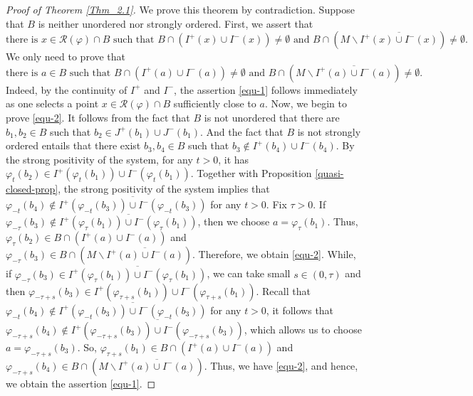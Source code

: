 \documentclass[a4paper,11pt]{article}
\theoremstyle{plain}
\theoremstyle{definition}
\numberwithin{equation}{section}
\begin{document}
	\begin{proof}[Proof of Theorem \ref{Thm_2.1}]
		We prove this theorem by contradiction. Suppose that $B$ is neither unordered nor strongly ordered. First, we assert that
		\begin{equation}\label{equ-1}
			 \text{there is } x\in \mathcal{R}(\varphi)\cap B \text{ such that } B\cap (I^+(x)\cup I^-(x))\neq\emptyset \text{ and } B\cap (M\backslash \overline{I^+(x)\cup I^-(x)})\neq\emptyset.
		\end{equation}
		We only need to prove that 
		\begin{equation}\label{equ-2}
		\text{there is } a\in B \text{ such that } B\cap (I^+(a)\cup I^-(a))\neq\emptyset \text{~and~} B\cap (M\backslash \overline{I^+(a)\cup I^-(a)})\neq\emptyset.
		\end{equation}
		Indeed, by the continuity of $I^{+}$ and $I^{-}$, the assertion \eqref{equ-1} follows immediately as one selects a point $x\in \mathcal{R}(\varphi)\cap B$ sufficiently close to $a$.
        Now, we begin to prove \eqref{equ-2}. It follows from the fact that $B$ is not unordered that there are $b_1,b_2 \in B$ such that $b_2\in J^{+}(b_1)\cup J^{-}(b_1)$. 
        And the fact that $B$ is not strongly ordered entails that there exist $b_3,b_4 \in B$ such that $b_3\notin I^+(b_4)\cup I^-(b_4)$. 
        By the strong positivity of the system, for any $t>0$, it has $\varphi_{t}(b_2)\in I^+(\varphi_{t}(b_1))\cup I^-(\varphi_{t}(b_1))$. 
        Together with Proposition \ref{quasi-closed-prop}, the strong positivity of the system implies that $\varphi_{-t}(b_4)\notin\overline{I^+(\varphi_{-t}(b_3))\cup I^-(\varphi_{-t}(b_3))}$ for any $t>0$. 
        Fix $\tau>0$. If $\varphi_{-\tau}(b_3)\notin\overline{I^+(\varphi_{\tau}(b_1))\cup I^-(\varphi_{\tau}(b_1))}$, then we choose $a=\varphi_{\tau}(b_1)$. 
        Thus, $\varphi_{\tau}(b_2)\in B\cap (I^+(a)\cup I^-(a))$ and $\varphi_{-\tau}(b_3)\in B\cap (M\backslash \overline{I^+(a)\cup I^-(a)})$. 
        Therefore, we obtain \eqref{equ-2}.
		While, if $\varphi_{-\tau}(b_3)\in\overline{I^+(\varphi_{\tau}(b_1))\cup I^-(\varphi_{\tau}(b_1))}$, we can take small $s\in(0,\tau)$ and then $\varphi_{-\tau+s}(b_3)\in I^+(\varphi_{\tau+s}(b_1))\cup I^-(\varphi_{\tau+s}(b_1))$.
		Recall that $\varphi_{-t}(b_4)\notin\overline{I^+(\varphi_{-t}(b_3))\cup I^-(\varphi_{-t}(b_3))}$ for any $t>0$, it follows that $\varphi_{-\tau+s}(b_4)\notin\overline{I^+(\varphi_{-\tau+s}(b_3))\cup I^-(\varphi_{-\tau+s}(b_3))}$, which allows us to choose $a=\varphi_{-\tau+s}(b_3)$. 
        So, $\varphi_{\tau+s}(b_1)\in B\cap (I^+(a)\cup I^-(a))$ and $\varphi_{-\tau+s}(b_4)\in B\cap (M\backslash \overline{I^+(a)\cup I^-(a)})$. 
        Thus, we have \eqref{equ-2}, and hence, we obtain the assertion \eqref{equ-1}.
		

\end{proof}
\end{document}
